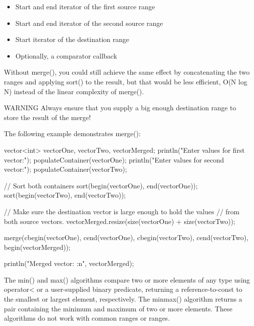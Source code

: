 \begin{itemize}
\item
Start and end iterator of the first source range

\item
Start and end iterator of the second source range

\item
Start iterator of the destination range

\item
Optionally, a comparator callback
\end{itemize}

Without merge(), you could still achieve the same effect by concatenating the two ranges and applying sort() to the result, but that would be less efficient, O(N log N) instead of the linear complexity of merge().

\begin{myWarning}{WARNING}
Always ensure that you supply a big enough destination range to store the result of the merge!
\end{myWarning}

The following example demonstrates merge():

\begin{cpp}
vector<int> vectorOne, vectorTwo, vectorMerged;
println("Enter values for first vector:");
populateContainer(vectorOne);
println("Enter values for second vector:");
populateContainer(vectorTwo);

// Sort both containers
sort(begin(vectorOne), end(vectorOne));
sort(begin(vectorTwo), end(vectorTwo));

// Make sure the destination vector is large enough to hold the values
// from both source vectors.
vectorMerged.resize(size(vectorOne) + size(vectorTwo));

merge(cbegin(vectorOne), cend(vectorOne),
      cbegin(vectorTwo), cend(vectorTwo), begin(vectorMerged));

println("Merged vector: {:n}", vectorMerged);
\end{cpp}


The min() and max() algorithms compare two or more elements of any type using operator< or a user-supplied binary predicate, returning a reference-to-const to the smallest or largest element, respectively. The minmax() algorithm returns a pair containing the minimum and maximum of two or more elements. These algorithms do not work with common ranges or ranges.


